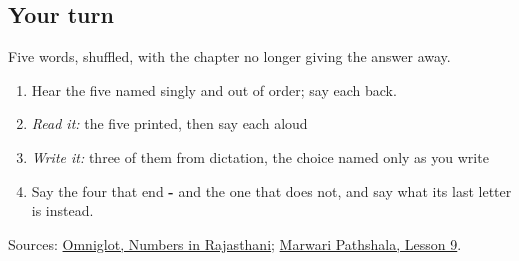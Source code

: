 \subsection*{Your turn}
Five words, shuffled, with the chapter no longer giving the answer away.

\begin{enumerate}
\raggedright
  \item Hear the five named singly and out of order; say each back.
  \item \emph{Read it:} the five printed, then say each aloud
  \item \emph{Write it:} three of them from dictation, the choice named only as you write
  \item Say the four that end \textbf{-} and the one that does not, and say what its last letter is instead.
\end{enumerate}

\begin{tcolorbox}[breakable,colback=teal!4,colframe=teal!35!black,title={Before you move on}]
Sources: \href{https://www.omniglot.com/language/numbers/rajasthani.htm}{Omniglot, Numbers in Rajasthani}; \href{https://www.marwaripathshala.com/marwari-lesson-9-english}{Marwari Pathshala, Lesson 9}.
\end{tcolorbox}
